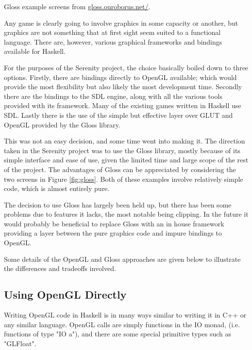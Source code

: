 \begin{marginfigure}
	\caption[Gloss example screens.]{Gloss example screens from \url{gloss.ouroborus.net/}.}
	\label{fig:gloss}
\end{marginfigure}

Any game is clearly going to involve graphics in some capacity or another, but graphics are not something that at first sight seem suited to a functional language. There are, however, various graphical frameworks and bindings available for Haskell.

For the purposes of the Serenity project, the choice basically boiled down to three options. Firstly, there are bindings directly to OpenGL available; which would provide the most flexibility but also likely the most development time. Secondly there are the bindings to the SDL engine, along with all the various tools provided with its framework. Many of the existing games written in Haskell use SDL. Lastly there is the use of the simple but effective layer over GLUT and OpenGL provided by the Gloss library.

This was not an easy decision, and some time went into making it. The direction taken in the Serenity project was to use the Gloss library, mostly because of its simple interface and ease of use, given the limited time and large scope of the rest of the project. The advantages of Gloss can be appreciated by considering the two screens in Figure \ref{fig:gloss}. Both of these examples involve relatively simple code, which is almost entirely pure.

The decision to use Gloss has largely been held up, but there has been some problems due to features it lacks, the most notable being clipping. In the future it would probably be beneficial to replace Gloss with an in house framework providing a layer between the pure graphics code and impure bindings to OpenGL.

Some details of the OpenGL and Gloss approaches are given below to illustrate the differences and tradeoffs involved.

\subsection{Using OpenGL Directly}

Writing OpenGL code in Haskell is in many ways similar to writing it in C++ or any similar language. OpenGL calls are simply functions in the IO monad, (i.e. functions of type "IO a"), and there are some special primitive types such as "GLFloat". 

